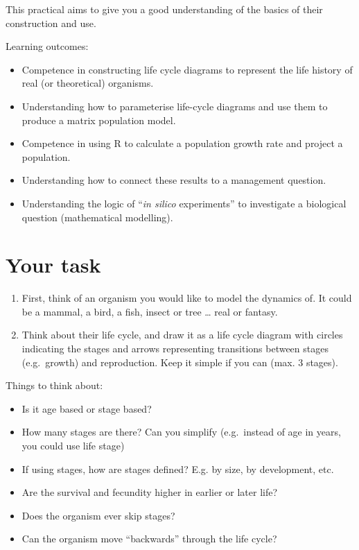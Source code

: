 \documentclass[
  a4paper]{book}
\providecommand{\tightlist}{%
  \setlength{\itemsep}{0pt}\setlength{\parskip}{0pt}}
\begin{document}
This practical aims to give you a good understanding of the basics of their construction and use.

\begin{do-something}
Learning outcomes:

\begin{itemize}
\tightlist
\item
  Competence in constructing life cycle diagrams to represent the life
  history of real (or theoretical) organisms.
\item
  Understanding how to parameterise life-cycle diagrams and use them to
  produce a matrix population model.
\item
  Competence in using R to calculate a population growth rate and
  project a population.
\item
  Understanding how to connect these results to a management question.
\item
  Understanding the logic of ``\emph{in silico} experiments'' to
  investigate a biological question (mathematical modelling).
\end{itemize}
\end{do-something}

\section{Your task}\label{your-task-8}

\begin{enumerate}
\def\labelenumi{\arabic{enumi})}
\item
  First, think of an organism you would like to model the dynamics of. It could be a mammal, a bird, a fish, insect or tree \ldots{} real or fantasy.
\item
  Think about their life cycle, and draw it as a life cycle diagram with circles indicating the stages and arrows representing transitions between stages (e.g.~growth) and reproduction. Keep it simple if you can (max. 3 stages).
\end{enumerate}

Things to think about:

\begin{itemize}
\tightlist
\item
  Is it age based or stage based?
\item
  How many stages are there? Can you simplify (e.g.~instead of age in years, you could use life stage)
\item
  If using stages, how are stages defined? E.g. by size, by development, etc.
\item
  Are the survival and fecundity higher in earlier or later life?
\item
  Does the organism ever skip stages?
\item
  Can the organism move ``backwards'' through the life cycle?
\end{itemize}
\end{document}
